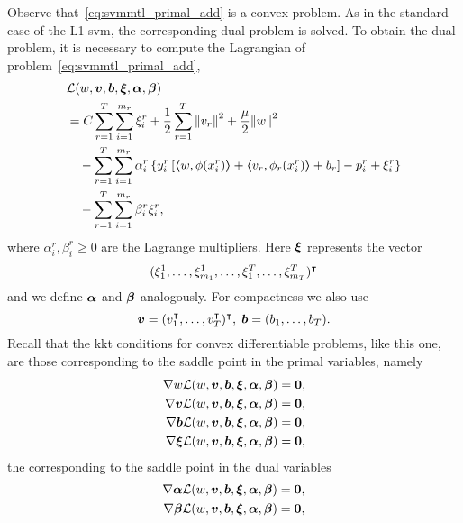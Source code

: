 Observe that~\eqref{eq:svmmtl_primal_add} is a convex problem. As in the standard case of the L1-\acrshort{svm}, the corresponding dual problem is solved. To obtain the dual problem, it is necessary to compute the Lagrangian of problem~\eqref{eq:svmmtl_primal_add},
\begin{equation}\label{eq:svmmtl_lagrangian_add}
    \begin{aligned}
        & \lagr({w}, \fv{v}, \fv{b}, \fv{\xi}, \fv{\alpha}, \fv{\beta}) \\
        &= C \sum_{r= 1}^T \sum_{i=1}^{m_r} {\xi_{i}^r} + \frac{1}{2} \sum_{r= 1}^T{\norm{{v}_r}^2} + \frac{\mu}{2} {\norm{{w}}}^2 \\
        &\quad -  \sum_{r= 1}^T \sum_{i=1}^{m_r} \alpha_i^r \left\lbrace y_{i}^r \left[ \dotp{w}{\phi(x_{i}^r)} + \dotp{{v}_r}{\phi_r(x_{i}^r)} + b_r \right] - p_{i}^r + \xi_{i}^r  \right\rbrace \\
        &\quad -  \sum_{r= 1}^T \sum_{i=1}^{m_r} \beta_i^r \xi_i^r ,
    \end{aligned}
\end{equation}
where $\alpha_i^r, \beta_i^r \geq 0$ are the Lagrange multipliers. Here $\bm{\xi}$ represents the vector $$(\xi_1^1, \ldots, \xi_{m_1}^1, \ldots, \xi_1^T, \ldots, \xi_{m_T}^T)^\intercal$$ and we define $\bm{\alpha}$ and $\bm{\beta}$ analogously. For compactness we also use
$$ \bm{v} = (v_1^\intercal, \ldots, v_T^\intercal)^\intercal,\; \bm{b} = (b_1, \ldots, b_T).$$
Recall that the \acrshort{kkt} conditions for convex differentiable problems, like this one, are those corresponding to the saddle point in the primal variables, namely
\begin{align}
    \nabla w \mathcal{L}({w}, \bm{v}, \bm{b}, \bm{\xi}, \bm{\alpha}, \bm{\beta}) = \bm{0}, \nonumber \\
    \nabla \bm{v} \mathcal{L}({w}, \bm{v}, \bm{b}, \bm{\xi}, \bm{\alpha}, \bm{\beta}) = \bm{0}, \nonumber \\
    \nabla \bm{b} \mathcal{L}({w}, \bm{v}, \bm{b}, \bm{\xi}, \bm{\alpha}, \bm{\beta}) = \bm{0}, \nonumber \\
    \nabla \bm{\xi} \mathcal{L}({w}, \bm{v}, \bm{b}, \bm{\xi}, \bm{\alpha}, \bm{\beta}) = \bm{0} , \nonumber
\end{align}
the corresponding to the saddle point in the dual variables
\begin{align}
    \nabla \bm{\alpha} \mathcal{L}({w}, \bm{v}, \bm{b}, \bm{\xi}, \bm{\alpha}, \bm{\beta}) = \bm{0}, \nonumber \\
    \nabla \bm{\beta} \mathcal{L}({w}, \bm{v}, \bm{b}, \bm{\xi}, \bm{\alpha}, \bm{\beta}) = \bm{0} , \nonumber
\end{align}
